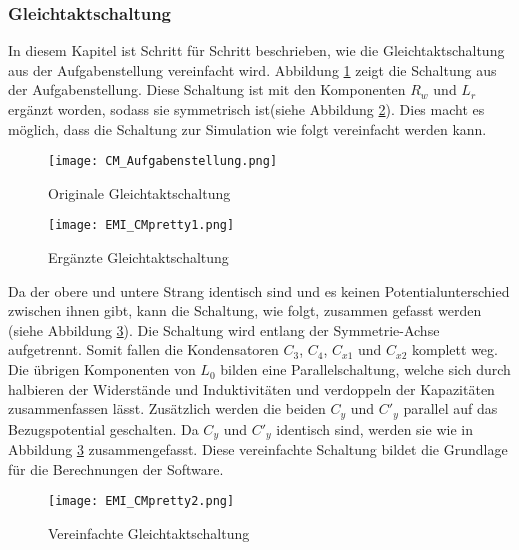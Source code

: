 \subsubsection{Gleichtaktschaltung} \label{subsec:gleichtakt}
In diesem Kapitel ist Schritt für Schritt beschrieben, wie die Gleichtaktschaltung aus der Aufgabenstellung vereinfacht wird. Abbildung \ref{fig:orig_CMSchaltung} zeigt die Schaltung aus der Aufgabenstellung. Diese Schaltung ist mit den Komponenten $R_w$ und $L_r$ ergänzt worden, sodass sie symmetrisch ist(siehe Abbildung \ref{fig:CMSchaltung1}). Dies macht es möglich, dass die Schaltung zur Simulation wie folgt vereinfacht werden kann.
\begin{figure}[H]
	\centering
	\texttt{[image: CM\_Aufgabenstellung.png]}
	\caption{Originale Gleichtaktschaltung\cite{aufgabenstellung}}
	\label{fig:orig_CMSchaltung}
\end{figure}
\begin{figure}[H]
	\centering
	\texttt{[image: EMI\_CMpretty1.png]}
	\caption{Ergänzte Gleichtaktschaltung}
	\label{fig:CMSchaltung1}
\end{figure}
Da der obere und untere Strang identisch sind und es keinen Potentialunterschied zwischen ihnen gibt, kann die Schaltung, wie folgt, zusammen gefasst werden (siehe Abbildung \ref{fig:CMSchaltung2}). Die Schaltung wird entlang der Symmetrie-Achse aufgetrennt. Somit fallen die Kondensatoren $C_3$, $C_4$, $C_{x1}$ und $C_{x2}$ komplett weg. Die übrigen Komponenten von $L_0$ bilden eine Parallelschaltung, welche sich durch halbieren der Widerstände und Induktivitäten und verdoppeln der Kapazitäten zusammenfassen lässt. Zusätzlich werden die beiden $C_y$ und $C'_{y}$ parallel auf das Bezugspotential geschalten. Da $C_y$ und $C'_y$ identisch sind, werden sie wie in Abbildung \ref{fig:CMSchaltung2} zusammengefasst. Diese vereinfachte Schaltung bildet die Grundlage für die Berechnungen der Software.
\begin{figure}[H]
	\centering
	\texttt{[image: EMI\_CMpretty2.png]}
	\caption{Vereinfachte Gleichtaktschaltung}
	\label{fig:CMSchaltung2}
\end{figure}